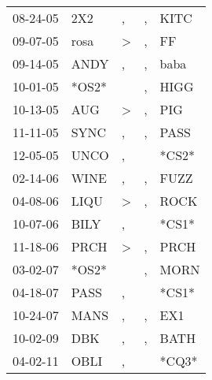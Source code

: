 \begin{supertabular}{lllll}
 08-24-05 &    2X2 &                , &             , &   KITC \\
 09-07-05 &   rosa &     \textgreater &             , &     FF \\
 09-14-05 &   ANDY &                , &             , &   baba \\
 10-01-05 &  *OS2* &                  &             , &   HIGG \\
 10-13-05 &    AUG &     \textgreater &             , &    PIG \\
 11-11-05 &   SYNC &                , &             , &   PASS \\
 12-05-05 &   UNCO &                , &               &  *CS2* \\
 02-14-06 &   WINE &                , &             , &   FUZZ \\
 04-08-06 &   LIQU &     \textgreater &             , &   ROCK \\
 10-07-06 &   BILY &                , &               &  *CS1* \\
 11-18-06 &   PRCH &     \textgreater &             , &   PRCH \\
 03-02-07 &  *OS2* &                  &             , &   MORN \\
 04-18-07 &   PASS &                , &               &  *CS1* \\
 10-24-07 &   MANS &                , &             , &    EX1 \\
 10-02-09 &    DBK &                , &             , &   BATH \\
 04-02-11 &   OBLI &                , &               &  *CQ3* \\
\end{supertabular}
